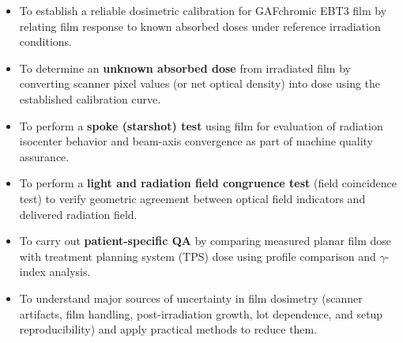 \begin{itemize}
	\item To establish a reliable dosimetric calibration for GAFchromic\texttrademark{} EBT3 film by relating film response to known absorbed doses under reference irradiation conditions.

	\item To determine an \textbf{unknown absorbed dose} from irradiated film by converting scanner pixel values (or net optical density) into dose using the established calibration curve.

	\item To perform a \textbf{spoke (starshot) test} using film for evaluation of radiation isocenter behavior and beam-axis convergence as part of machine quality assurance.

	\item To perform a \textbf{light and radiation field congruence test} (field coincidence test) to verify geometric agreement between optical field indicators and delivered radiation field.

	\item To carry out \textbf{patient-specific QA} by comparing measured planar film dose with treatment planning system (TPS) dose using profile comparison and $\gamma$-index analysis.

	\item To understand major sources of uncertainty in film dosimetry (scanner artifacts, film handling, post-irradiation growth, lot dependence, and setup reproducibility) and apply practical methods to reduce them.
\end{itemize}

